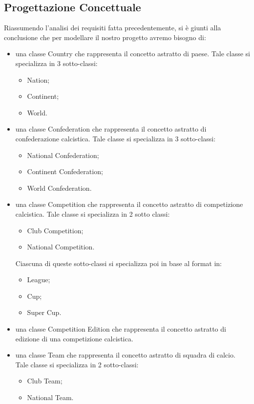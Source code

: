 \subsection{Progettazione Concettuale}

Riassumendo l'analisi dei requisiti fatta precedentemente, si è giunti alla conclusione
che per modellare il nostro progetto avremo bisogno di:
\begin{itemize}
	
	\item una classe Country che rappresenta il concetto astratto di paese.
		Tale classe si specializza in 3 sotto-classi:	
		\begin{itemize}
			\item Nation;
			\item Continent;
			\item World.
		\end{itemize}
	
	\item una classe Confederation che rappresenta il concetto astratto di confederazione calcistica.
		Tale classe si specializza in 3 sotto-classi:	
		\begin{itemize}
			\item National Confederation;
			\item Continent Confederation;
			\item World Confederation.
		\end{itemize}

	\item una classe Competition che rappresenta il concetto astratto di competizione calcistica.
		Tale classe si specializza in 2 sotto classi:	
		\begin{itemize}
			\item Club Competition;
			\item National Competition.
		\end{itemize}	
		Ciascuna di queste sotto-classi si specializza poi in base al format in:
		\begin{itemize}
			\item League;
			\item Cup;
			\item Super Cup.
		\end{itemize}

	\item una classe Competition Edition che rappresenta il concetto astratto di
		edizione di una competizione calcistica.
	
	\item una classe Team che rappresenta il concetto astratto di squadra di calcio.
		Tale classe si specializza in 2 sotto-classi:
		\begin{itemize}
			\item Club Team;
			\item National Team.
		\end{itemize}	


\end{itemize}
